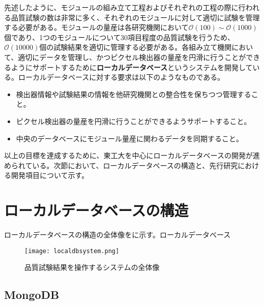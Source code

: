 先述したように、モジュールの組み立て工程およびそれぞれの工程の際に行われる品質試験の数は非常に多く、それぞれのモジュールに対して適切に試験を管理する必要がある。モジュールの量産は各研究機関において$\mathcal{O}(100)\sim \mathcal{O}(1000)$個であり、1つのモジュールについて$30$項目程度の品質試験を行うため、$\mathcal{O}(10000)$個の試験結果を適切に管理する必要がある。各組み立て機関において、適切にデータを管理し、かつピクセル検出器の量産を円滑に行うことができるようにサポートするために\textbf{ローカルデータベース}というシステムを開発している。ローカルデータベースに対する要求は以下のようなものである。
\begin{itemize}
  \item 検出器情報や試験結果の情報を他研究機関との整合性を保ちつつ管理すること。
  \item ピクセル検出器の量産を円滑に行うことができるようサポートすること。
  \item 中央のデータベースにモジュール量産に関わるデータを同期すること。
\end{itemize}

以上の目標を達成するために、東工大を中心にローカルデータベースの開発が進められている。次節において、ローカルデータベースの構造と、先行研究における開発項目について示す。

\section{ローカルデータベースの構造}
\label{sec:AboutLocalDB}
ローカルデータベースの構造の全体像をに示す。ローカルデータベース


\begin{figure}[tbp]
  \centering
  \texttt{[image: localdbsystem.png]}
  \caption[品質試験結果を操作するシステムの全体像]{品質試験結果を操作するシステムの全体像}
  \label{fig:localdb-collection}
\end{figure}

\subsection{MongoDB\cite{mongo}}
\label{sec:mongo}


